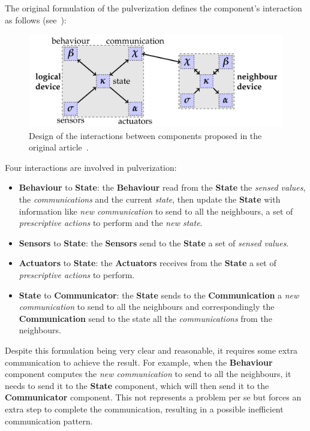 The original formulation of the pulverization defines the component's interaction as follows (see~):

\begin{figure}
	\centering
	\includegraphics[width=\textwidth]{figures/original-components-interactions.png}
	\caption{Design of the interactions between components proposed in the original article~\cite{fi12110203}.}
	\label{fig:framework-components-interaction}
\end{figure}

Four interactions are involved in pulverization:
\begin{itemize}
	\item \textbf{Behaviour} to \textbf{State}: the \textbf{Behaviour} read from the \textbf{State} the \textit{sensed values}, the \textit
	      {communications} and the current \textit{state}, then update the \textbf{State} with information like \textit{new communication} to send to
	      all the neighbours, a set of \textit{prescriptive actions} to perform and the \textit{new state}.
	\item \textbf{Sensors} to \textbf{State}: the \textbf{Sensors} send to the \textbf{State} a set of \textit{sensed values}.
	\item \textbf{Actuators} to \textbf{State}: the \textbf{Actuators} receives from the \textbf{State} a set of \textit{prescriptive actions} to
	      perform.
	\item \textbf{State} to \textbf{Communicator}: the \textbf{State} sends to the \textbf{Communication} a \textit{new communication}
	      to send to all the neighbours and correspondingly the \textbf{Communication} send to the state all the \textit{communications} from the
	      neighbours.
\end{itemize}


Despite this formulation being very clear and reasonable, it requires some extra communication to achieve the result.
For example, when the \textbf{Behaviour} component computes the \textit{new communication} to send to all the neighbours, it needs to send it to the
\textbf{State} component, which will then send it to the \textbf{Communicator} component. This not represents a problem per se but forces an extra
step to complete the communication, resulting in a possible inefficient communication pattern.

